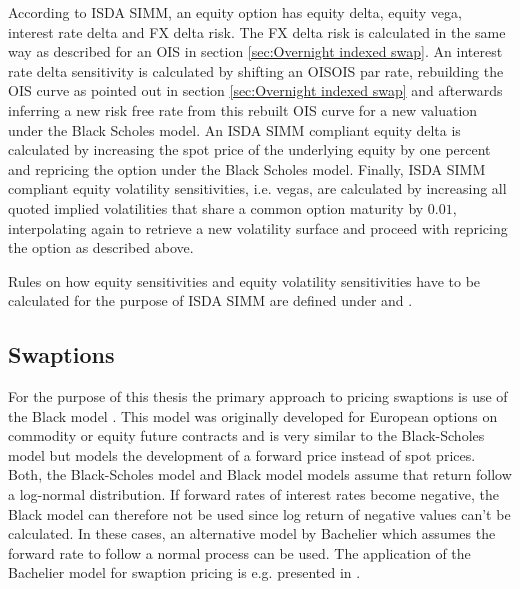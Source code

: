\documentclass[../Thesis_AHoecherl.tex]{subfiles}
\begin{document}
    According to \gls{ISDA SIMM}, an equity option has equity delta, equity vega, interest rate delta and FX delta risk. The FX delta risk is calculated in the same way as described for an \gls{OIS} in section \ref{sec:Overnight indexed swap}.
    An interest rate delta sensitivity is calculated by shifting an \gls{OIS}\gls{OIS} par rate, rebuilding the \gls{OIS} curve as pointed out in section \ref{sec:Overnight indexed swap} and afterwards inferring a new risk free rate from this rebuilt \gls{OIS} curve for a new valuation under the Black Scholes model.
    An \gls{ISDA SIMM} compliant equity delta is calculated by increasing the spot price of the underlying equity by one percent and repricing the option under the Black Scholes model.
    Finally, \gls{ISDA SIMM} compliant equity volatility sensitivities, i.e. vegas, are calculated by increasing all quoted implied volatilities that share a common option maturity by $0.01$, interpolating again to retrieve a new volatility surface and proceed with repricing the option as described above.

    Rules on how equity sensitivities and equity volatility sensitivities have to be calculated for the purpose of \gls{ISDA SIMM} are defined under \cite[Section 2.5 and 2.8]{RiskDataStandard} and \cite[Points 21, 26 and section C.3]{SIMM}.

    \subsection{Swaptions}

    For the purpose of this thesis the primary approach to pricing swaptions is use of the Black model \cite{black1976pricing}. This model was originally developed for European options on commodity or equity future contracts and is very similar to the Black-Scholes model but models the development of a forward price instead of spot prices.
    Both, the Black-Scholes model and Black model models assume that return follow a log-normal distribution.
    If forward rates of interest rates become negative, the Black model can therefore not be used since log return of negative values can't be calculated.
    In these cases, an alternative model by Bachelier \cite{bachelier1990theorie} which assumes the forward rate to follow a normal process can be used.
    The application of the Bachelier model for swaption pricing is e.g. presented in \cite{floc2016fast}.
\end{document}
